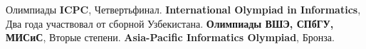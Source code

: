\begin{rubric}{Олимпиады}
\entry*[2019] \textbf{ICPC}, Четвертьфинал.
%
\entry*[2018 -- 2019] \textbf{International Olympiad in Informatics}, Два года участвовал от сборной Узбекистана.
%
\entry*[2019] \textbf{Олимпиады ВШЭ, СПбГУ, МИСиС}, Вторые степени.
%
\entry*[2019] \textbf{Asia-Pacific Informatics Olympiad}, Бронза.

\end{rubric}